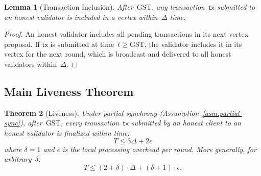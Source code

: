 \documentclass[11pt,a4paper]{article}
\newtheorem{theorem}{Theorem}[section]
\newtheorem{lemma}[theorem]{Lemma}
\theoremstyle{definition}
\theoremstyle{remark}
\newcommand{\GST}{\mathrm{GST}}
\begin{document}
\begin{lemma}[Transaction Inclusion]\label{lem:tx-inclusion}
After~$\GST$, any transaction~$\mathsf{tx}$ submitted to an honest
validator is included in a vertex within~$\Delta$ time.
\end{lemma}

\begin{proof}
An honest validator includes all pending transactions in its next vertex
proposal.
If $\mathsf{tx}$ is submitted at time~$t \geq \GST$, the validator
includes it in its vertex for the next round, which is broadcast and
delivered to all honest validators within~$\Delta$.
\end{proof}

\subsection{Main Liveness Theorem}

\begin{theorem}[Liveness]\label{thm:liveness}
Under partial synchrony (Assumption~\ref{asm:partial-sync}), after~$\GST$,
every transaction~$\mathsf{tx}$ submitted by an honest client to an honest
validator is finalized within time:
\[
  T \leq 3\Delta + 2\epsilon
\]
where $\delta = 1$ and $\epsilon$ is the local processing overhead per round.
More generally, for arbitrary~$\delta$:
\[
  T \leq (2 + \delta) \cdot \Delta + (\delta + 1) \cdot \epsilon.
\]
\end{theorem}
\end{document}
